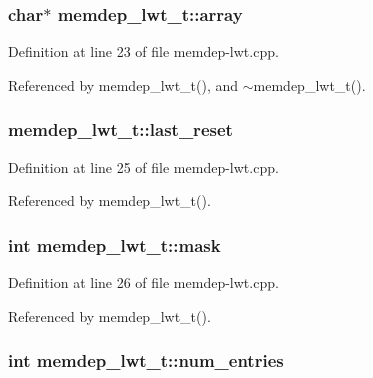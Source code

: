\subsubsection[{array}]{\setlength{\rightskip}{0pt plus 5cm}char$\ast$ {\bf memdep\_\-lwt\_\-t::array}\hspace{0.3cm}{\tt  [protected]}}\label{classmemdep__lwt__t_7a99c2c83fefe33d25ac2b8b9c8a8ab4}




Definition at line 23 of file memdep-lwt.cpp.

Referenced by memdep\_\-lwt\_\-t(), and $\sim$memdep\_\-lwt\_\-t().
\subsubsection[{last\_\-reset}]{ {\bf memdep\_\-lwt\_\-t::last\_\-reset}\hspace{0.3cm}{\tt  [protected]}}\label{classmemdep__lwt__t_1425a1261abc9d69b9aa7458386f5fe6}




Definition at line 25 of file memdep-lwt.cpp.

Referenced by memdep\_\-lwt\_\-t().
\subsubsection[{mask}]{\setlength{\rightskip}{0pt plus 5cm}int {\bf memdep\_\-lwt\_\-t::mask}\hspace{0.3cm}{\tt  [protected]}}\label{classmemdep__lwt__t_52e155eeb0717313e304e54e36a25e7c}




Definition at line 26 of file memdep-lwt.cpp.

Referenced by memdep\_\-lwt\_\-t().
\subsubsection[{num\_\-entries}]{\setlength{\rightskip}{0pt plus 5cm}int {\bf memdep\_\-lwt\_\-t::num\_\-entries}\hspace{0.3cm}{\tt  [protected]}}\label{classmemdep__lwt__t_138873aec3b31620c2893dc866068b37}




